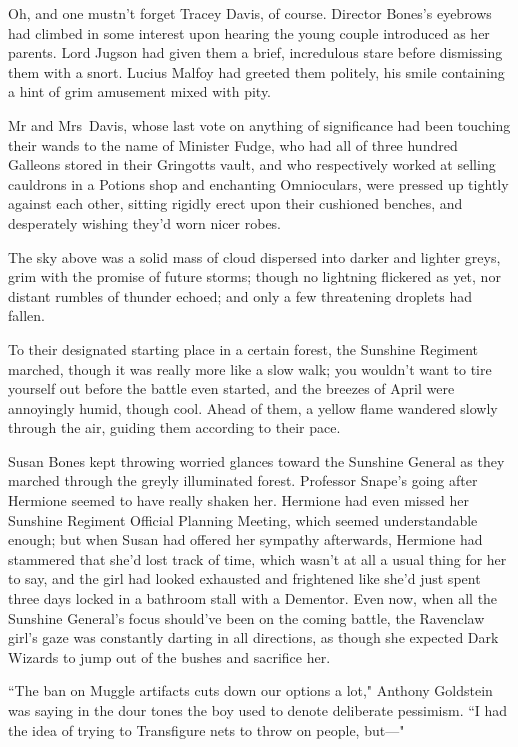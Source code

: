 Oh, and one mustn't forget Tracey Davis, of course. Director Bones's eyebrows had climbed in some interest upon hearing the young couple introduced as her parents. Lord Jugson had given them a brief, incredulous stare before dismissing them with a snort. Lucius Malfoy had greeted them politely, his smile containing a hint of grim amusement mixed with pity.

Mr and Mrs~Davis, whose last vote on anything of significance had been touching their wands to the name of Minister Fudge, who had all of three hundred Galleons stored in their Gringotts vault, and who respectively worked at selling cauldrons in a Potions shop and enchanting Omnioculars, were pressed up tightly against each other, sitting rigidly erect upon their cushioned benches, and desperately wishing they'd worn nicer robes.

The sky above was a solid mass of cloud dispersed into darker and lighter greys, grim with the promise of future storms; though no lightning flickered as yet, nor distant rumbles of thunder echoed; and only a few threatening droplets had fallen.

\later

To their designated starting place in a certain forest, the Sunshine Regiment marched, though it was really more like a slow walk; you wouldn't want to tire yourself out before the battle even started, and the breezes of April were annoyingly humid, though cool. Ahead of them, a yellow flame wandered slowly through the air, guiding them according to their pace.

Susan Bones kept throwing worried glances toward the Sunshine General as they marched through the greyly illuminated forest. Professor Snape's going after Hermione seemed to have really shaken her. Hermione had even missed her Sunshine Regiment Official Planning Meeting, which seemed understandable enough; but when Susan had offered her sympathy afterwards, Hermione had stammered that she'd lost track of time, which wasn't at all a usual thing for her to say, and the girl had looked exhausted and frightened like she'd just spent three days locked in a bathroom stall with a Dementor. Even now, when all the Sunshine General's focus should've been on the coming battle, the Ravenclaw girl's gaze was constantly darting in all directions, as though she expected Dark Wizards to jump out of the bushes and sacrifice her.

``The ban on Muggle artifacts cuts down our options a lot," Anthony Goldstein was saying in the dour tones the boy used to denote deliberate pessimism. ``I had the idea of trying to Transfigure nets to throw on people, but—"

